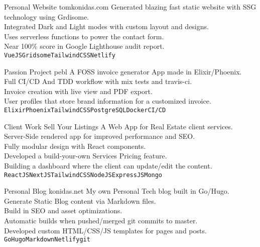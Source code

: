 \documentclass[9pt]{developercv} %
\begin{document}


\begin{entrylist}
	\entry
		{Personal Website}
		{tomkonidas.com}
		{}
		{Generated blazing fast static website with SSG technology using Grdisome.\\
      Integrated Dark and Light modes with custom layout and designs.\\
      Uses serverless functions to power the contact form.\\ 
      Near 100\% score in Google Lighthouse audit report.
      \\\texttt{VueJS}\slashsep\texttt{Gridsome}\slashsep\texttt{TailwindCSS}\slashsep\texttt{Netlify}}

	\entry
		{Passion Project}
		{pebl}
		{}
		{A FOSS invoice generator App made in Elixir/Phoenix.\\
      Full CI/CD And TDD workflow with mix tests and travis-ci.\\
      Invoice creation with live view and PDF export.\\ 
      User profiles that store brand information for a customized invoice.
      \\\texttt{Elixir}\slashsep\texttt{Phoenix}\slashsep\texttt{TailwindCSS}\slashsep\texttt{PostgreSQL}\slashsep\texttt{Docker}\slashsep\texttt{CI/CD}}

	\entry
		{Client Work}
		{Sell Your Listings}
		{}
		{A Web App for Real Estate client services.\\
      Server-Side rendered app for improved performance and SEO.\\
      Fully modular design with React components.\\
      Developed a build-your-own Services Pricing feature.\\ 
      Building a dashboard where the client can update/edit the content.
      \\\texttt{ReactJS}\slashsep\texttt{NextJS}\slashsep\texttt{TailwindCSS}\slashsep\texttt{NodeJS}\slashsep\texttt{ExpressJS}\slashsep\texttt{Mongo}}

	\entry
		{Personal Blog}
		{konidas.net}
		{}
		{My own Personal Tech blog built in Go/Hugo.\\
      Generate Static Blog content via Markdown files.\\
      Build in SEO and asset optimizations.\\
      Automatic builds when pushed/merged git commits to master.\\
      Developed custom HTML/CSS/JS templates for pages and posts.
      \\\texttt{Go}\slashsep\texttt{Hugo}\slashsep\texttt{Markdown}\slashsep\texttt{Netlify}\slashsep\texttt{git}}


\end{entrylist}
\end{document}
